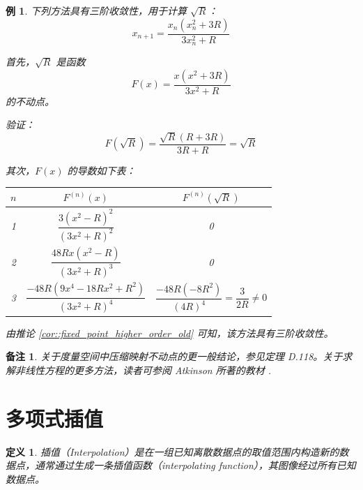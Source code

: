 \documentclass[a4paper]{ctexart}
\newtheorem{remark}{备注}
\newtheorem{definition}[theorem]{定义} %
\newtheorem{example}[theorem]{例}
\numberwithin{theorem}{section}
\numberwithin{equation}{section}
\numberwithin{figure}{section}
\numberwithin{remark}{section}
\begin{document}
\begin{example}
下列方法具有三阶收敛性，用于计算 \( \sqrt{R} \)：
\begin{equation}
x_{n+1} = \frac{x_n (x_n^2 + 3R)}{3x_n^2 + R}
\end{equation}

首先，\( \sqrt{R} \) 是函数
\begin{equation}
F(x) = \frac{x(x^2 + 3R)}{3x^2 + R}
\end{equation}
的不动点。

验证：
\begin{equation}
F(\sqrt{R}) = \frac{\sqrt{R}(R + 3R)}{3R + R} = \sqrt{R}
\end{equation}

其次，\( F(x) \) 的导数如下表：

\begin{tabular}{@{}c|c|c@{}}
\toprule
\( n \) & \( F^{(n)}(x) \) & \( F^{(n)}(\sqrt{R}) \) \\
\midrule
1 & \( \dfrac{3(x^2 - R)^2}{(3x^2 + R)^2} \) & 0 \\
2 & \( \dfrac{48Rx(x^2 - R)}{(3x^2 + R)^3} \) & 0 \\
3 & \( \dfrac{-48R(9x^4 - 18Rx^2 + R^2)}{(3x^2 + R)^4} \) & \( \dfrac{-48R(-8R^2)}{(4R)^4} = \dfrac{3}{2R} \ne 0 \) \\
\bottomrule
\end{tabular}

由推论 \ref{cor::fixed_point_higher_order_old} 可知，该方法具有三阶收敛性。
\end{example}

\begin{remark}
关于度量空间中压缩映射不动点的更一般结论，参见定理 D.118。关于求解非线性方程的更多方法，读者可参阅 Atkinson 所著的教材 \cite[第二章]{Atkinson1989Introduction}.
\end{remark}

\section{多项式插值}

\begin{definition}
    插值（Interpolation）是在一组已知离散数据点的取值范围内构造新的数据点，通常通过生成一条插值函数（interpolating function），其图像经过所有已知数据点。
\end{definition}
\end{document}
